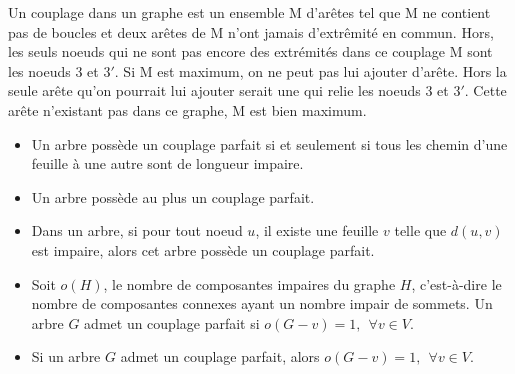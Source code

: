 \begin{figure}[h!]
  \begin{center}
  \end{center}
\end{figure}
\begin{solution}
Un couplage dans un graphe est un ensemble M d’arêtes tel que
M ne contient pas de boucles et deux arêtes de M n’ont jamais
d’extrêmité en commun. Hors, les seuls noeuds qui ne sont pas encore des extrémités dans ce couplage M sont les noeuds $3$ et $3'$. Si M est maximum, on ne peut pas lui ajouter d'arête. Hors la seule arête qu'on pourrait lui ajouter serait une qui relie les noeuds $3$ et $3'$. Cette arête n'existant pas dans ce graphe, M est bien maximum.
\end{solution}


\begin{itemize}
  \item Un arbre possède un couplage parfait si et seulement si tous les chemin d'une feuille à une autre sont de longueur impaire.
  \item Un arbre possède au plus un couplage parfait.
  \item Dans un arbre, si pour tout noeud $u$, il existe une feuille $v$ telle que $d(u,v)$ est impaire, alors cet arbre possède un couplage parfait.
  \item Soit $o(H)$, le nombre de composantes impaires du graphe $H$, c'est-à-dire le nombre de composantes connexes ayant un nombre impair de sommets. Un arbre $G$ admet un couplage parfait si $o(G-v)=1,  \ \ \forall v \in V$.
  \item Si un arbre $G$ admet un couplage parfait, alors $o(G-v)=1, \ \ \forall v \in V$.
\end{itemize}


